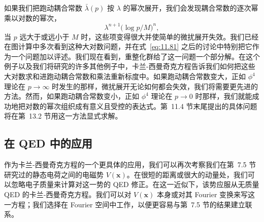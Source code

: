 如果我们把跑动耦合常数 $\bar{\lambda}(p)$ 按 $\lambda$ 的幂次展开，我们会发现耦合常数的逐次幂乘以对数的幂次，
\begin{equation}
  \lambda^{n+1}\bigl( \log p/M \bigr)^n ,
\end{equation}
当 $p$ 远大于或远小于 $M$ 时，这些项变得很大并使简单的微扰展开失效。我们已经在图计算中多次看到这种大对数问题，并在式~\eqref{eq:11.81} 之后的讨论中特别把它作为一个问题加以评述。我们现在看到，重整化群给了这一问题一个部分解。在这个例子以及我们将研究的许多其他例子中，卡兰-西曼奇克方程告诉我们如何把这些大对数求和进跑动耦合常数和乘法重新标度中。如果跑动耦合常数变大，正如 $\phi^4$ 理论在 $p\to\infty$ 时发生的那样，微扰展开无论如何都会失效，我们将需要更先进的方法。然而，如果跑动耦合常数变小，正如 $\phi^4$ 理论在 $p\to 0$ 时那样，我们就能成功地把对数的幂次组织成有意义且受控的表达式。第~11.4 节末尾提出的具体问题将在第~13.2 节用这一方法显式求解。

\subsection{在 QED 中的应用}

作为卡兰-西曼奇克方程的一个更具体的应用，我们可以再次考察我们在第~7.5 节研究过的静态电荷之间的电磁势 $V(\mathbf{x})$。在很短的距离或很大的动量处，我们可以忽略电子质量来计算对这一势的 QED 修正。在这一近似下，该势应服从无质量 QED 的卡兰-西曼奇克方程。我们可以对 $V(\mathbf{x})$ 本身或对其 Fourier 变换来写这一方程；我们选择在 Fourier 空间中工作，以便更容易与第~7.5 节的结果建立联系。

